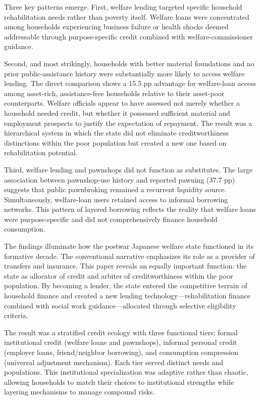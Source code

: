 \documentclass[12pt]{article}
\begin{document}
Three key patterns emerge. First, welfare lending targeted specific household rehabilitation needs rather than poverty itself. Welfare loans were concentrated among households experiencing business failure or health shocks deemed addressable through purpose-specific credit combined with welfare-commissioner guidance.

Second, and most strikingly, households with better material foundations and no prior public-assistance history were substantially more likely to access welfare lending. The direct comparison shows a 15.5 pp advantage for welfare-loan access among asset-rich, assistance-free households relative to their asset-poor counterparts. Welfare officials appear to have assessed not merely whether a household needed credit, but whether it possessed sufficient material and employment prospects to justify the expectation of repayment. The result was a hierarchical system in which the state did not eliminate creditworthiness distinctions within the poor population but created a new one based on rehabilitation potential.

Third, welfare lending and pawnshops did not function as substitutes. The large association between pawnshop-use history and reported pawning (37.7 pp) suggests that public pawnbroking remained a recurrent liquidity source. Simultaneously, welfare-loan users retained access to informal borrowing networks. This pattern of layered borrowing reflects the reality that welfare loans were purpose-specific and did not comprehensively finance household consumption.

The findings illuminate how the postwar Japanese welfare state functioned in its formative decade. The conventional narrative emphasizes its role as a provider of transfers and insurance. This paper reveals an equally important function: the state as allocator of credit and arbiter of creditworthiness within the poor population. By becoming a lender, the state entered the competitive terrain of household finance and created a new lending technology---rehabilitation finance combined with social work guidance---allocated through selective eligibility criteria.

The result was a stratified credit ecology with three functional tiers: formal institutional credit (welfare loans and pawnshops), informal personal credit (employer loans, friend/neighbor borrowing), and consumption compression (universal adjustment mechanism). Each tier served distinct needs and populations. This institutional specialization was adaptive rather than chaotic, allowing households to match their choices to institutional strengths while layering mechanisms to manage compound risks.
\end{document}
